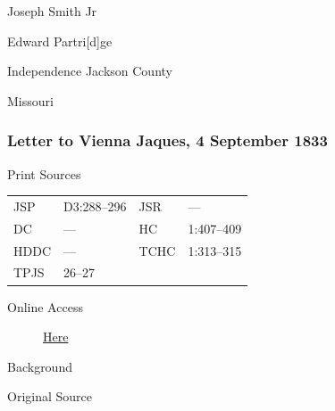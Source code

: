 				\begin{tightright}
					Joseph Smith Jr
				\end{tightright}
				
				Edward Partri[d]ge
				
				Independence Jackson County
				
				Missouri
				
		\subsubsection{Letter to Vienna Jaques, 4 September 1833}
			\label{EMS-1833-JS-4-SEP-1833}
		
			\begin{description}
				\item[Print Sources]
			\end{description}

				\begin{tabular}{p{0.5in}p{1in}p{0.5in}p{1in}}
				JSP	 	& D3:288--296		& JSR 		& --- \\
				DC	 	& --- 				& HC 		& 1:407--409 \\
				HDDC 	& ---				& TCHC 		& 1:313--315 \\
				TPJS 	& 26--27			& 	 		&  \\
				\end{tabular}
			
			\begin{description}
				\item[Online Access] \href{https://www.josephsmithpapers.org/paper-summary/letter-to-vienna-jaques-4-september-1833/1}{Here}
			\end{description}
			
			\begin{description}
				\item[Background]
			\end{description}
			
			
			\begin{description}
				\item[Original Source]
			\end{description}
			
